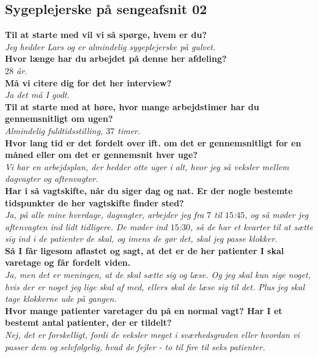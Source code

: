 \clearpage
\subsection{Sygeplejerske på sengeafsnit 02} \label{bilagO2}
\textbf{Til at starte med vil vi så spørge, hvem er du?}\\
\noindent
\textit{Jeg hedder Lars og er almindelig sygeplejerske på gulvet.}\\
\noindent
\textbf{Hvor længe har du arbejdet på denne her afdeling?} \\
\noindent
\textit{$28$ år.}\\
\noindent
\textbf{Må vi citere dig for det her interview?}\\
\noindent
\textit{Ja det må I godt.}\\
\noindent
\textbf{Til at starte med at høre, hvor mange arbejdstimer har du gennemsnitligt om ugen?}\\
\noindent
\textit{Almindelig fuldtidsstilling, $37$ timer.}\\
\noindent
\textbf{Hvor lang tid er det fordelt over ift. om det er gennemsnitligt for en måned eller om det er gennemsnit hver uge?}\\
\noindent
\textit{Vi har en arbejdsplan, der hedder otte uger i alt, hvor jeg så veksler mellem dagvagter og aftenvagter.}\\
\noindent
\textbf{Har i så vagtskifte, når du siger dag og nat. Er der nogle bestemte tidspunkter de her vagtskifte finder sted?}\\
\noindent
\textit{Ja, på alle mine hverdage, dagvagter, arbejder jeg fra $7$ til $15$:$45$, og så møder jeg aftenvagten ind lidt tidligere. De møder ind $15$:$30$, så de har et kvarter til at sætte sig ind i de patienter de skal, og imens de gør det, skal jeg passe klokker.}\\
\noindent
\textbf{Så I får ligesom aflastet og sagt, at det er de her patienter I skal varetage og får fordelt viden.}\\
\noindent
\textit{Ja, men det er meningen, at de skal sætte sig og læse. Og jeg skal kun sige noget, hvis der er noget jeg lige skal af med, ellers skal de læse sig til det. Plus jeg skal tage klokkerne ude på gangen.}\\
\noindent
\textbf{Hvor mange patienter varetager du på en normal vagt? Har I et bestemt antal patienter, der er tildelt?}\\
\noindent
\textit{Nej, det er forskelligt, fordi de veksler meget i sværhedsgraden eller hvordan vi passer dem og selvfølgelig, hvad de fejler - to til fire til seks patienter.}\\
